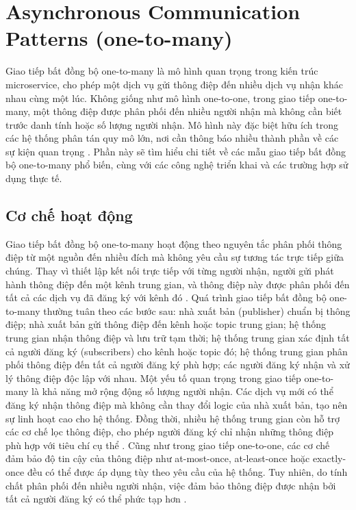 \section{Asynchronous Communication Patterns (one-to-many)}
Giao tiếp bất đồng bộ one-to-many là mô hình quan trọng trong kiến trúc microservice, cho phép một dịch vụ gửi thông điệp đến nhiều dịch vụ nhận khác nhau cùng một lúc. Không giống như mô hình one-to-one, trong giao tiếp one-to-many, một thông điệp được phân phối đến nhiều người nhận mà không cần biết trước danh tính hoặc số lượng người nhận. Mô hình này đặc biệt hữu ích trong các hệ thống phân tán quy mô lớn, nơi cần thông báo nhiều thành phần về các sự kiện quan trọng \cite{newman2015}. Phần này sẽ tìm hiểu chi tiết về các mẫu giao tiếp bất đồng bộ one-to-many phổ biến, cùng với các công nghệ triển khai và các trường hợp sử dụng thực tế.
\subsection{Cơ chế hoạt động}
Giao tiếp bất đồng bộ one-to-many hoạt động theo nguyên tắc phân phối thông điệp từ một nguồn đến nhiều đích mà không yêu cầu sự tương tác trực tiếp giữa chúng. Thay vì thiết lập kết nối trực tiếp với từng người nhận, người gửi phát hành thông điệp đến một kênh trung gian, và thông điệp này được phân phối đến tất cả các dịch vụ đã đăng ký với kênh đó \cite{hohpe2004}.
Quá trình giao tiếp bất đồng bộ one-to-many thường tuân theo các bước sau: nhà xuất bản (publisher) chuẩn bị thông điệp; nhà xuất bản gửi thông điệp đến kênh hoặc topic trung gian; hệ thống trung gian nhận thông điệp và lưu trữ tạm thời; hệ thống trung gian xác định tất cả người đăng ký (subscribers) cho kênh hoặc topic đó; hệ thống trung gian phân phối thông điệp đến tất cả người đăng ký phù hợp; các người đăng ký nhận và xử lý thông điệp độc lập với nhau.
Một yếu tố quan trọng trong giao tiếp one-to-many là khả năng mở rộng động số lượng người nhận. Các dịch vụ mới có thể đăng ký nhận thông điệp mà không cần thay đổi logic của nhà xuất bản, tạo nên sự linh hoạt cao cho hệ thống. Đồng thời, nhiều hệ thống trung gian còn hỗ trợ các cơ chế lọc thông điệp, cho phép người đăng ký chỉ nhận những thông điệp phù hợp với tiêu chí cụ thể \cite{richardson2019}.
Cũng như trong giao tiếp one-to-one, các cơ chế đảm bảo độ tin cậy của thông điệp như at-most-once, at-least-once hoặc exactly-once đều có thể được áp dụng tùy theo yêu cầu của hệ thống. Tuy nhiên, do tính chất phân phối đến nhiều người nhận, việc đảm bảo thông điệp được nhận bởi tất cả người đăng ký có thể phức tạp hơn \cite{aksakalli2021}.
